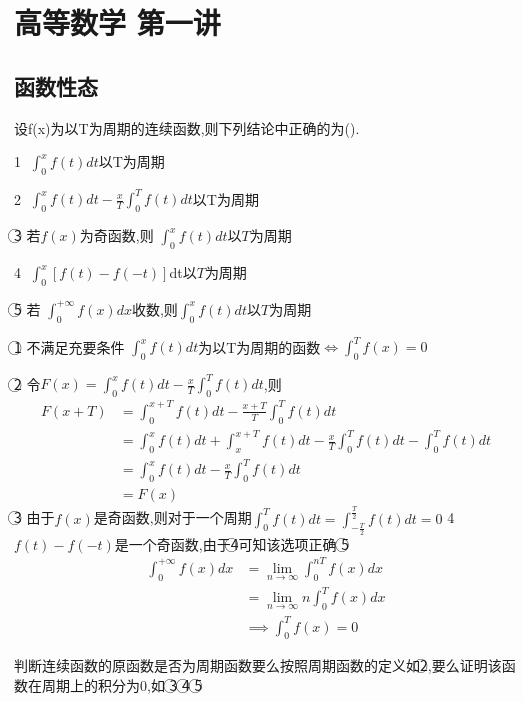 \documentclass[12pt, a4paper, oneside, UTF8]{ctexbook}
\begin{document}

\else
\fi

\chapter{高等数学 第一讲}

\section{函数性态}

\begin{example}
设f(x)为以T为周期的连续函数,则下列结论中正确的为().

\textcircled{1} $\int _ {0}^ {x} f(t)dt$以T为周期

\textcircled{2} $\int _ {0}^ {x} f(t)dt - \frac {x}{T} \int _ {0}^ {T} f(t)dt$以T为周期

\textcircled{3} 若$f(x)$为奇函数,则 $\int _ {0}^ {x} f(t)dt$以$T$为周期

\textcircled{4} $\int _ {0}^ {x} [f(t)-f(-t)]$dt以$T$为周期

\textcircled{5} 若 $\int _ {0}^ {+\infty } f(x)dx$收数,则$ \int _ {0}^ {x} f(t)dt$以$T$为周期

\end{example} 
\begin{solution} 
    \textcircled{1} 不满足充要条件 $\int _ {0}^ {x} f(t)dt$为以T为周期的函数$\iff \int_{0}^{T}f(x)=0$

    \textcircled{2} 令$F(x)=\int _ {0}^ {x} f(t)dt - \frac {x}{T} \int _ {0}^ {T} f(t)dt$,则
    \begin{align*}
        F(x+T)  &= \int _ {0}^ {x+T} f(t)dt - \frac {x+T}{T} \int _ {0}^ {T} f(t)dt \\
                &= \int _ {0}^ {x} f(t)dt + \int _ {x}^ {x + T} f(t)dt - \frac {x}{T} \int _ {0}^ {T} f(t)dt - \int _ {0}^ {T} f(t)dt \\
                &= \int _ {0}^ {x} f(t)dt - \frac {x}{T} \int _ {0}^ {T} f(t)dt \\
                &= F(x)
    \end{align*}
    \textcircled{3} 由于$f(x)$是奇函数,则对于一个周期$\int _ {0}^ {T} f(t)dt = \int _ {-\frac{T}{2}}^ {\frac{T}{2}} f(t)dt = 0$ 
    \newline 
    \textcircled{4} $f(t)-f(-t)$是一个奇函数,由于\textcircled{4}可知该选项正确
    \newline
    \textcircled{5} 
    \begin{align*}
    \int _ {0}^ {+\infty } f(x)dx &= \lim_{n\rightarrow\infty}\int _ {0}^ {nT } f(x)dx \\
    &=\lim_{n\rightarrow\infty}n\int _ {0}^ {T} f(x)dx \\
    &\implies \int _ {0}^ {T} f(x) = 0
    \end{align*}
\end{solution}
\begin{remark}
    判断连续函数的原函数是否为周期函数要么按照周期函数的定义如\textcircled{2},要么证明该函数在周期上的积分为0,如
    \textcircled{3} \textcircled{4} \textcircled{5}
\end{remark}
\end{document}
